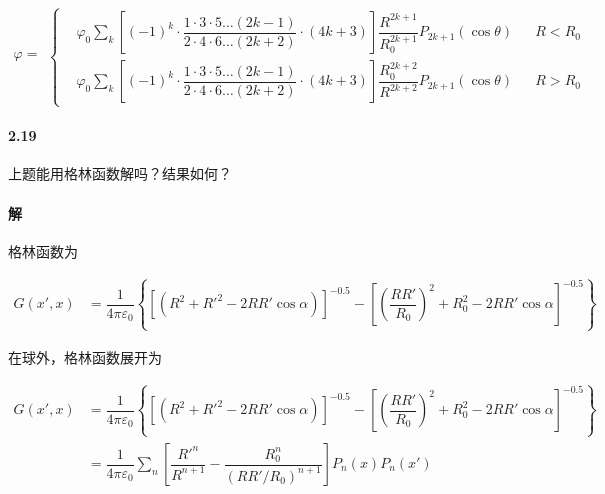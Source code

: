 \documentclass{article}
\begin{document}
\begin{equation*}
  \begin{aligned}
    \varphi = 
  \end{aligned}
  \left\{
  \begin{aligned}
    &\varphi_0 \sum_k \left[ \left( -1  \right)^k \cdot \dfrac{1 \cdot 3 \cdot 5 \dots \left( 2k-1 \right)}{2 \cdot 4 \cdot 6 \dots \left( 2k+2 \right)} \cdot \left( 4k+3 \right)
 \right] \dfrac{R^{2k+1}}{R_0^{2k+1}}  P_{2k+1} \left( \cos \theta \right) && R<R_0\\
    &\varphi_0 \sum_k \left[ \left( -1  \right)^k \cdot \dfrac{1 \cdot 3 \cdot 5 \dots \left( 2k-1 \right)}{2 \cdot 4 \cdot 6 \dots \left( 2k+2 \right)} \cdot \left( 4k+3 \right)
 \right] \dfrac{R_0^{2k+2}}{R^{2k+2}}  P_{2k+1} \left( \cos \theta \right) && R>R_0
  \end{aligned}
  \right.
\end{equation*}

\paragraph{2.19}

上题能用格林函数解吗？结果如何？

\paragraph{解}

格林函数为

\begin{equation*}
  \begin{aligned}
    G \left( x', x \right) &= 
      \dfrac{1}{4\pi \varepsilon_0} \left\{ \left[ \left( R^2 + R'^2 - 2 R R' \cos \alpha \right) \right]^{-0.5} -
      \left[ \left( \dfrac{R R'}{R_0}  \right)^2 + R_0^2 - 2 RR' \cos \alpha \right]^{-0.5}
    \right\}
  \end{aligned}
\end{equation*}

在球外，格林函数展开为

\begin{equation*}
  \begin{aligned}
    G \left( x', x \right) &= 
      \dfrac{1}{4\pi \varepsilon_0} \left\{ \left[ \left( R^2 + R'^2 - 2 R R' \cos \alpha \right) \right]^{-0.5} -
      \left[ \left( \dfrac{R R'}{R_0}  \right)^2 + R_0^2 - 2 RR' \cos \alpha \right]^{-0.5}
    \right\} \\
    &= \dfrac{1}{4\pi \varepsilon_0} \sum_n \left[ \dfrac{R'^n}{R^{n+1}} - \dfrac{R_0^n}{\left( RR'/R_0 \right)^{n+1}}   \right] P_n \left( x \right) P_n \left( x' \right)
  \end{aligned}
\end{equation*}
\end{document}
